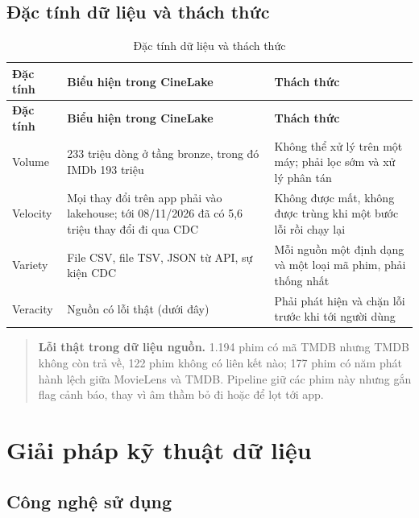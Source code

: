 \documentclass[a4paper,11pt]{article}
\newlength{\reporttablewidth}
\begin{document}
\subsection{Đặc tính dữ liệu và thách thức}\label{sec:2.4}

\begingroup
\small
{}
\setlength{\tabcolsep}{4pt}
\renewcommand{\arraystretch}{1.18}
\setlength{\reporttablewidth}{\dimexpr\linewidth-4\tabcolsep\relax}
\begin{longtable}{@{}L{0.15\reporttablewidth} L{0.40\reporttablewidth} L{0.45\reporttablewidth}@{}}
\caption[Đặc tính dữ liệu và thách thức (mục 2.4)]{Đặc tính dữ liệu và thách thức}\label{tab:06} \\
\toprule
\textbf{Đặc tính} & \textbf{Biểu hiện trong CineLake} & \textbf{Thách thức} \\
\midrule
\endfirsthead
\toprule
\textbf{Đặc tính} & \textbf{Biểu hiện trong CineLake} & \textbf{Thách thức} \\
\midrule
\endhead
\midrule
\endfoot
\bottomrule
\endlastfoot
Volume & 233 triệu dòng ở tầng bronze, trong đó IMDb 193 triệu & Không thể xử lý trên một máy; phải lọc sớm và xử lý phân tán \\
Velocity & Mọi thay đổi trên app phải vào lakehouse; tới 08/11/2026 đã có 5,6 triệu thay đổi đi qua CDC & Không được mất, không được trùng khi một bước lỗi rồi chạy lại \\
Variety & File CSV, file TSV, JSON từ API, sự kiện CDC & Mỗi nguồn một định dạng và một loại mã phim, phải thống nhất \\
Veracity & Nguồn có lỗi thật (dưới đây) & Phải phát hiện và chặn lỗi trước khi tới người dùng \\
\end{longtable}
\endgroup

\begin{quote}
\textbf{Lỗi thật trong dữ liệu nguồn.} 1.194 phim có mã TMDB nhưng TMDB không còn trả về, 122 phim không có liên kết nào; 177 phim có năm phát hành lệch giữa MovieLens và TMDB. Pipeline giữ các phim này nhưng gắn flag cảnh báo, thay vì âm thầm bỏ đi hoặc để lọt tới app.
\end{quote}

\section{Giải pháp kỹ thuật dữ liệu}\label{sec:3}

\subsection{Công nghệ sử dụng}\label{sec:3.1}
\end{document}
